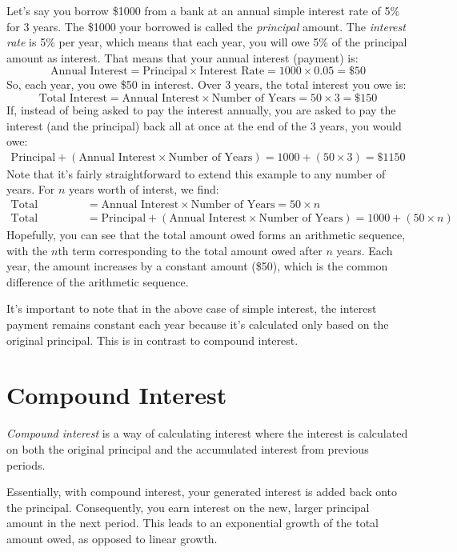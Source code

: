 \begin{eg}
	Let's say you borrow \$1000 from a bank at an annual simple interest rate of 5\% for 3 years. 
	The \$1000 your borrowed is called the \textit{principal} amount. The \textit{interest rate} is 5\% per year, which means that
	each year, you will owe 5\% of the principal amount as interest. That means that your annual interest (payment) is:
	\begin{equation*}
		\text{Annual Interest} = \text{Principal} \times \text{Interest Rate} = 1000 \times 0.05 = \$50
	\end{equation*}
	So, each year, you owe \$50 in interest. Over 3 years, the total interest you owe is:
	\begin{equation*}
		\text{Total Interest} = \text{Annual Interest} \times \text{Number of Years} = 50 \times 3 = \$150
	\end{equation*}
	If, instead of being asked to pay the interest annually, you are asked to pay the interest (and the principal) back 
	all at once at the end of the 3 years, you would owe:
	\begin{align*}
		\text{Principal} + (\text{Annual Interest} \times \text{Number of Years}) &= 1000 + (50 \times 3) = \$1150
	\end{align*}
	Note that it's fairly straightforward to extend this example to any number of years. For $n$ years worth of interst, we find:
	\begin{align*}
		\text{Total Interest} &= \text{Annual Interest} \times \text{Number of Years} = 50 \times n \\
		\text{Total Amount Owed} &= \text{Principal} + (\text{Annual Interest} \times \text{Number of Years}) = 1000 + (50 \times n)
	\end{align*}
	Hopefully, you can see that the total amount owed forms an arithmetic sequence, with the $n$th term corresponding to the total amount owed
	after $n$ years. Each year, the amount increases by a constant amount (\$50), which is the common difference of the arithmetic sequence.
\end{eg}

It's important to note that in the above case of simple interest, the interest payment remains
constant each year because it's calculated only based on the original principal. This is in contrast to compound interest. 

\section{Compound Interest}

\begin{definition}
	  \textit{Compound interest} is a way of calculating interest where the interest is calculated on both the original principal
  and the accumulated interest from previous periods.
\end{definition}

Essentially, with compound interest, your generated interest is added back onto the principal. 
Consequently, you earn interest on the new, larger principal amount in the next period. 
This leads to an exponential growth of the total amount owed, as opposed to linear growth. 